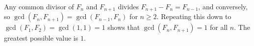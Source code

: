 Any common divisor of $F_n$ and $F_{n+1}$ divides $F_{n+1}-F_n=F_{n-1}$, and conversely, so $\gcd(F_n,F_{n+1})=\gcd(F_{n-1},F_n)$ for $n\ge2$. Repeating this down to $\gcd(F_1,F_2)=\gcd(1,1)=1$ shows that $\gcd(F_n,F_{n+1})=1$ for all $n$. The greatest possible value is $\boxed{1}$.
